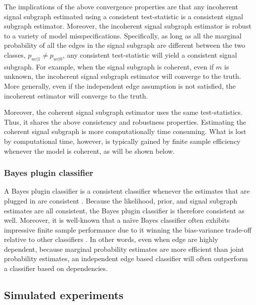 \documentclass[10pt,journal,cspaper,compsoc]{IEEEtran}
\begin{document}
The implications of the above convergence properties are that any incoherent signal subgraph estimated using a consistent test-statistic is a consistent signal subgraph estimator.  Moreover, the incoherent signal subgraph estimator is robust to a variety of model misspecifications.  Specifically, as long as all the marginal probability of all the edges in the signal subgraph are different between the two classes, $p_{uv|1}\neq p_{uv|0}$, any consistent test-statistic will yield a consistent signal subgraph.  For example, when the signal subgraph is coherent, even if $m$ is unknown, the incoherent signal subgraph estimator will converge to the truth.  More generally, even if the independent edge assumption is not satisfied, the incoherent estimator will converge to the truth.

Moreover, the coherent signal subgraph estimator uses the same test-statistics.  Thus, it shares the above consistency and robustness properties.  Estimating the coherent signal subgraph is more computationally time consuming. What is lost by computational time, however, is typically gained by finite sample efficiency whenever the model is coherent, as will be shown below.


\subsubsection{Bayes plugin classifier}

A Bayes plugin classifier is a consistent classifier whenever the estimates that are plugged in are consistent \cite{Bickel2000}.  Because the likelihood, prior, and signal subgraph estimates are all consistent, the Bayes plugin classifier is therefore consistent as well.  Moreover, it is well-known that a na\"ive Bayes classifier often exhibits impressive finite sample performance due to it winning the bias-variance trade-off relative to other classifiers \cite{Hand2001}.  In other words, even when edge are highly dependent, because marginal probability estimates are more efficient than joint probability estimates, an independent edge based classifier will often outperform a classifier based on dependencies.






\subsection{Simulated experiments} %
\label{sub:subsection_name}
\end{document}
